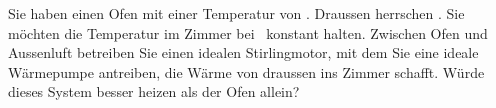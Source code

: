 Sie haben einen Ofen mit einer Temperatur von \tofO. Draussen herrschen \taO. Sie möchten die Temperatur im Zimmer bei \tiO\ konstant halten. Zwischen Ofen und Aussenluft betreiben Sie einen idealen Stirlingmotor, mit dem Sie eine ideale Wärmepumpe antreiben, die Wärme von draussen ins Zimmer schafft. Würde dieses System besser heizen als der Ofen allein?
